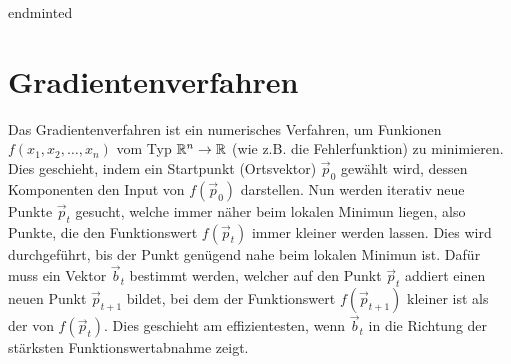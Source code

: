 \begin{appendices}
end{minted}

\chapter{Gradientenverfahren}\label{sec:anhang_gd}
Das Gradientenverfahren ist ein numerisches Verfahren, um Funkionen $f(x_1,
x_2, \ldots, x_n)$ vom Typ $\mathbb{R}^n \to \mathbb{R}$ (wie z.B. die Fehlerfunktion)
zu minimieren.
Dies geschieht, indem ein Startpunkt (Ortsvektor) $\vec{p}_0$ gewählt wird, dessen
Komponenten den Input von $f(\vec{p}_0)$ darstellen.
Nun werden iterativ neue Punkte $\vec{p}_t$ gesucht, welche immer näher beim lokalen Minimun liegen, also Punkte, die den Funktionswert $f(\vec{p}_t)$ immer kleiner werden lassen.
Dies wird durchgeführt, bis der Punkt genügend nahe beim lokalen Minimun ist.
\para{}
Dafür muss ein Vektor $\vec{b}_t$ bestimmt werden, welcher auf den Punkt $\vec{p}_t$ addiert einen neuen Punkt $\vec{p}_{t+1}$ bildet,
bei dem der Funktionswert $f(\vec{p}_{t+1})$ kleiner ist als der von $f(\vec{p}_t)$.
Dies geschieht am effizientesten, wenn $\vec{b}_t$ in die Richtung der stärksten Funktionswertabnahme zeigt.


\end{appendices}
